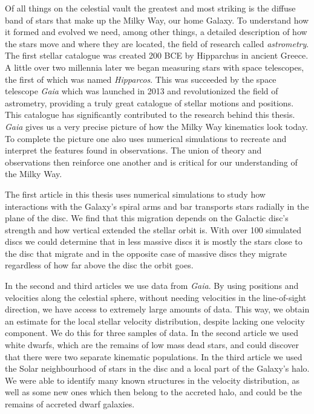 Of all things on the celestial vault the greatest and most striking is the diffuse band of stars that make up the Milky Way, our home Galaxy. To understand how it formed and evolved we need, among other things, a detailed description of how the stars move and where they are located, the field of research called \textit{astrometry}. The first stellar catalogue was created 200 BCE by Hipparchus in ancient Greece. A little over two millennia later we began measuring stars with space telescopes, the first of which was named \textit{Hipparcos}. This was succeeded by the space telescope \textit{Gaia} which was launched in 2013 and revolutionized the field of astrometry, providing a truly great catalogue of stellar motions and positions. This catalogue has significantly contributed to the research behind this thesis. \textit{Gaia} gives us a very precise picture of how the Milky Way kinematics look today. To complete the picture one also uses numerical simulations to recreate and interpret the features found in observations. The union of theory and observations then reinforce one another and is critical for our understanding of the Milky Way.

The first article in this thesis uses numerical simulations to study how interactions with the Galaxy's spiral arms and bar transports stars radially in the plane of the disc. We find that this migration depends on the Galactic disc's strength and how vertical extended the stellar orbit is. With over 100 simulated discs we could determine that in less massive discs it is mostly the stars close to the disc that migrate and in the opposite case of massive discs they migrate regardless of how far above the disc the orbit goes.

In the second and third articles we use data from \textit{Gaia}. By using positions and velocities along the celestial sphere, without needing velocities in the line-of-sight direction, we have access to extremely large amounts of data. This way, we obtain an estimate for the local stellar velocity distribution, despite lacking one velocity component. We do this for three samples of data. In the second article we used white dwarfs, which are the remains of low mass dead stars, and could discover that there were two separate kinematic populations. In the third article we used the Solar neighbourhood of stars in the disc and a local part of the Galaxy's halo. We were able to identify many known structures in the velocity distribution, as well as some new ones which then belong to the accreted halo, and could be the remains of accreted dwarf galaxies. 


